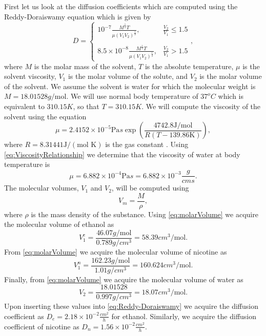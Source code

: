 \documentclass[\main/thesis.tex]{subfiles}
\begin{document}
First let us look at the diffusion coefficients which are computed using the Reddy-Doraiswamy equation \cite{Reddy} which is given by
\begin{equation}
D {=} 
\begin{cases}
  10^{-7} \frac{M^{\frac{1}{2}} T}{\mu (V_1 V_2)^{\frac{1}{3}}}, & \frac{V_2}{V_1} {\le} 1.5 \\ \\
  8.5 {\times} 10^{-8} \frac{M^{\frac{1}{2}} T}{\mu (V_1 V_2)^{\frac{1}{3}}}, & \frac{V_2}{V_1} > 1.5
\end{cases},
\label{eq:Reddy-Doraiswamy}
\end{equation}
where $M$ is the molar mass of the solvent, $T$ is the absolute temperature, $\mu$ is the solvent viscosity, $V_1$ is the molar volume of the solute, and $V_2$ is the molar volume of the solvent. We assume the solvent is water for which the molecular weight is $M {=} 18.01528 g/\text{mol}$. We will use normal body temperature of $37^o C$ which is equivalent to $310.15 K$, so that $T {=} 310.15 K$. We will compute the viscosity of the solvent using the equation
\begin{equation}
\mu {=} 2.4152{\times}10^{-5} \text{Pa} s \exp\left(\frac{4742.8 \text{J}/\text{mol}}{R(T-139.86 \text{K})}\right),
\label{eq:ViscosityRelationship}
\end{equation}
where $R {=} 8.31441 \text{J}/(\text{mol K})$ is the gas constant \cite{FogelSon}.
Using \eqref{eq:ViscosityRelationship} we determine that the viscosity of water at body temperature is
$$\mu {=} 6.882 {\times} 10^{-4} \text{Pa} s {=} 6.882 {\times} 10^{-3} \frac{g}{cm s}.$$ 
The molecular volumes, $V_1$ and $V_2$, will be computed using
\begin{equation}
    V_m {=} \frac{M}{\rho},
    \label{eq:molarVolume}
\end{equation}
where $\rho$ is the mass density of the substance. 
Using \eqref{eq:molarVolume} we acquire the molecular volume of ethanol as
$$V_1^e {=}  \frac{46.07 g/\text{mol}}{0.789 g/cm^3} {=} 58.39 cm^3/\text{mol}.$$
From \eqref{eq:molarVolume} we acquire the molecular volume of nicotine as
$$V_1^n {=} \frac{162.23 g/\text{mol}}{1.01 g/cm^3} {=} 160.624 cm^3/\text{mol}.$$
Finally, from \eqref{eq:molarVolume} we acquire the molecular volume of water as
$$V_2 {=} \frac{18.01528}{0.997 g/cm^3} {=} 18.07 cm^3/\text{mol}.$$
Upon inserting these values into \eqref{eq:Reddy-Doraiswamy} we acquire the diffusion coefficient as $D_e {=} 2.18{\times}10^{-2} \frac{cm^2}{h}$ for ethanol. Similarly, we acquire the diffusion coefficient of nicotine as $D_n {=} 1.56{\times}10^{-2} \frac{cm^2}{h}$.
\end{document}
